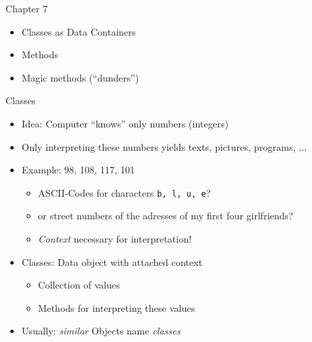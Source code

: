 \begin{frame}[fragile]{Chapter 7}
%
\begin{itemize}
\item Classes as Data Containers
\item Methods
\item Magic methods (\enquote{dunders})
\end{itemize}
%
\end{frame}


\begin{frame}{Classes}
%
\begin{itemize}
\item Idea: Computer \enquote{knows} only numbers (integers)
\item Only interpreting these numbers yields texts, pictures, programs, ...
\item Example: 98, 108, 117, 101
	\begin{itemize}
	\item ASCII-Codes for characters \texttt{b, l, u, e}?
	\item or street numbers of the adresses of my first four girlfriends?
	\item \emph{Context} necessary for interpretation!
	\end{itemize}
\item Classes: Data object with attached context
	\begin{itemize}
	\item Collection of values
	\item Methods for interpreting these values
	\end{itemize}
\item Usually: \emph{similar} Objects \Thus name \emph{classes}
\end{itemize}
%
\end{frame}


